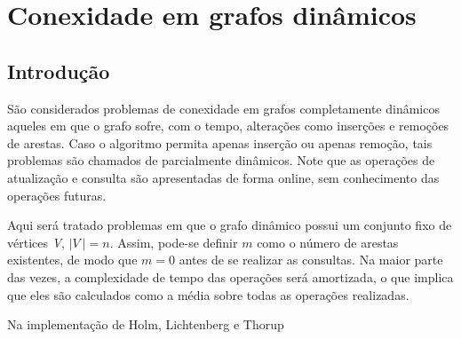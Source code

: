 
\chapter{Conexidade em grafos dinâmicos}

\section{Introdução}

São considerados problemas de conexidade em grafos completamente dinâmicos aqueles em que o grafo sofre, com o tempo, alterações como inserções e remoções 
de arestas. Caso o algoritmo permita apenas inserção ou apenas remoção, tais 
problemas são chamados de parcialmente dinâmicos. Note que as operações de 
atualização e consulta são apresentadas de forma online, sem conhecimento das  operações futuras. 

Aqui será tratado problemas em que o grafo dinâmico possui um conjunto fixo de vértices \textit{V}, $|\textit{V}\ | = n$. Assim, pode-se definir $m$ como o número de arestas existentes, de modo que $m = 0$ antes de se realizar as consultas. Na maior parte das vezes, a complexidade de tempo das operações será amortizada, o que implica que eles são calculados como a média sobre todas as operações realizadas. 

Na implementação de Holm, Lichtenberg e Thorup






